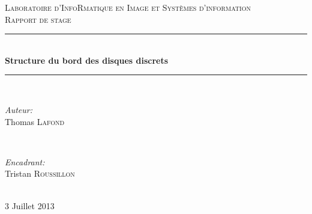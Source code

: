 \documentclass[12pt]{article} %
\begin{document}

\begin{titlepage}

\newcommand{\HRule}{\rule{\linewidth}{0.5mm}} %

\center %

\textsc{\LARGE Laboratoire d'InfoRmatique en Image et Syst\`{e}mes d'information}\\[1.5cm] %
\textsc{\large Rapport de stage}\\[0.5cm] %

\HRule \\[0.4cm]
{ \huge \bfseries Structure du bord des disques discrets}\\[0.4cm] %
\HRule \\[1.5cm]

\begin{minipage}{0.4\textwidth}
\begin{flushleft} \large
\emph{Auteur:}\\
Thomas \textsc{Lafond} %
\end{flushleft}
\end{minipage}
~
\begin{minipage}{0.4\textwidth}
\begin{flushright} \large
\emph{Encadrant:} \\
Tristan \textsc{Roussillon} %
\end{flushright}
\end{minipage}\\[4cm]

{\large 3 Juillet 2013}\\[3cm] %


\vfill %

\end{titlepage}
\end{document}
